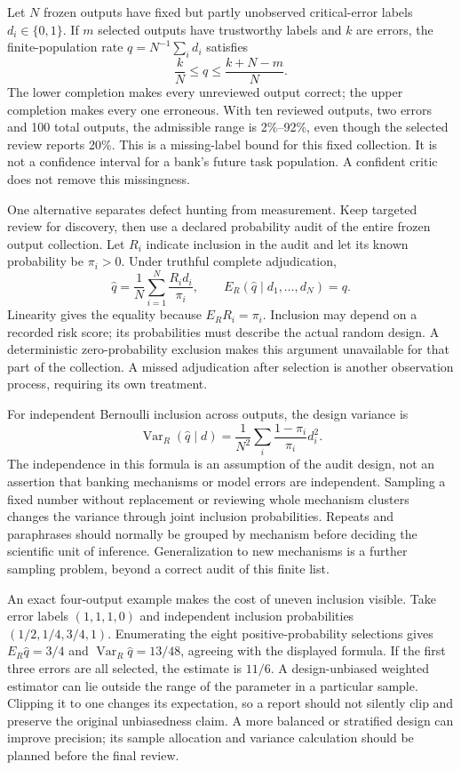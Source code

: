 Let \(N\) frozen outputs have fixed but partly unobserved critical-error
labels \(d_i\in\{0,1\}\). If \(m\) selected outputs have trustworthy labels
and \(k\) are errors, the finite-population rate \(q=N^{-1}\sum_i d_i\)
satisfies
\[
              \frac{k}{N}\leq q\leq\frac{k+N-m}{N}.
\]
The lower completion makes every unreviewed output correct; the upper
completion makes every one erroneous. With ten reviewed outputs, two
errors and 100 total outputs, the admissible range is 2\%--92\%, even though
the selected review reports 20\%. This is a missing-label bound for this
fixed collection. It is not a confidence interval for a bank's future task
population. A confident critic does not remove this missingness.

One alternative separates defect hunting from measurement. Keep targeted
review for discovery, then use a declared probability audit of the entire
frozen output collection. Let \(R_i\) indicate inclusion in the audit and
let its known probability be \(\pi_i>0\). Under truthful complete
adjudication,
\[
 \widehat q=\frac1N\sum_{i=1}^N\frac{R_i d_i}{\pi_i},
 \qquad
 E_R(\widehat q\mid d_1,\ldots,d_N)=q.
\]
Linearity gives the equality because \(E_R R_i=\pi_i\). Inclusion may depend
on a recorded risk score; its probabilities must describe the actual random
design. A deterministic zero-probability exclusion makes this argument
unavailable for that part of the collection. A missed adjudication after
selection is another observation process, requiring its own treatment.

For independent Bernoulli inclusion across outputs, the design variance is
\[
 \operatorname{Var}_R(\widehat q\mid d)
 =\frac1{N^2}\sum_i\frac{1-\pi_i}{\pi_i}d_i^2.
\]
The independence in this formula is an assumption of the audit design,
not an assertion that banking mechanisms or model errors are independent.
Sampling a fixed number without replacement or reviewing whole mechanism
clusters changes the variance through joint inclusion probabilities.
Repeats and paraphrases should normally be grouped by mechanism before
deciding the scientific unit of inference. Generalization to new mechanisms
is a further sampling problem, beyond a correct audit of this finite list.

An exact four-output example makes the cost of uneven inclusion visible.
Take error labels \((1,1,1,0)\) and independent inclusion probabilities
\((1/2,1/4,3/4,1)\). Enumerating the eight positive-probability selections
gives \(E_R\widehat q=3/4\) and
\(\operatorname{Var}_R\widehat q=13/48\), agreeing with the displayed
formula. If the first three errors are all selected, the estimate is
\(11/6\). A design-unbiased weighted estimator can lie outside the range
of the parameter in a particular sample. Clipping it to one changes its
expectation, so a report should not silently clip and preserve the original
unbiasedness claim. A more balanced or stratified design can improve
precision; its sample allocation and variance calculation should be planned
before the final review.
\citep{exec14_l7_exact}


